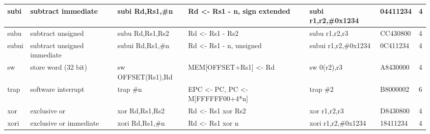 \documentclass[a4paper,9pt]{extarticle}
\begin{document}
{\begin{tabular}{| p{0.6cm} | p{4cm} | p{3cm} | p{4cm} | p{3cm} | l | l | }
        subi    & subtract immediate                    & subi Rd,Rs1,\#n       & Rd <- Rs1 - n, sign extended          & subi r1,r2,\#0x1234                   & 04411234  & 4\\ \hline
        subu    & subtract unsigned                     & subu Rd,Rs1,Rs2       & Rd <- Rs1 - Rs2                       & subu r1,r2,r3                         & CC430800  & 4\\ \hline
        subui   & subtract unsigned immediate           & subui Rd,Rs1,\#n      & Rd <- Rs1 - n, unsigned               & subui r1,r2,\#0x1234                  & 0C411234  & 4\\ \hline
        sw      & store word (32 bit)                   & sw OFFSET(Rs1),Rd     & MEM[OFFSET+Rs1] <- Rd                 & sw 0(r2),r3                           & A8430000  & 4\\ \hline
        trap    & software interrupt                    & trap \#n              & EPC <- PC, PC <- M[FFFFFF00+4*n]      & trap \#2                              & B8000002  & 6\\ \hline
        xor     & exclusive or                          & xor Rd,Rs1,Rs2        & Rd <- Rs1 xor Rs2                     & xor r1,r2,r3                          & D8430800  & 4\\ \hline
        xori    & exclusive or immediate                & xori Rd,Rs1,\#n       & Rd <- Rs1 xor n                       & xori r1,r2,\#0x1234                   & 18411234  & 4\\ \hline 
\end{tabular}
}\\
\end{document}
